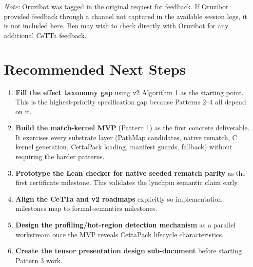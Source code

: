 \documentclass[11pt]{article}
\begin{document}
\vspace{1em}
\noindent\textit{Note:} Oruzibot was tagged in the original request for feedback. If Oruzibot provided feedback through a channel not captured in the available session logs, it is not included here. Ben may wish to check directly with Oruzibot for any additional CeTTa feedback.

\section{Recommended Next Steps}

\begin{enumerate}
    \item \textbf{Fill the effect taxonomy gap} using v2 Algorithm 1 as the starting point. This is the highest-priority specification gap because Patterns 2--4 all depend on it.

    \item \textbf{Build the match-kernel MVP} (Pattern 1) as the first concrete deliverable. It exercises every substrate layer (PathMap candidates, native rematch, C kernel generation, CettaPack loading, manifest guards, fallback) without requiring the harder patterns.

    \item \textbf{Prototype the Lean checker for native seeded rematch parity} as the first certificate milestone. This validates the lynchpin semantic claim early.

    \item \textbf{Align the CeTTa and v2 roadmaps} explicitly so implementation milestones map to formal-semantics milestones.

    \item \textbf{Design the profiling/hot-region detection mechanism} as a parallel workstream once the MVP reveals CettaPack lifecycle characteristics.

    \item \textbf{Create the tensor presentation design sub-document} before starting Pattern 3 work.
\end{enumerate}
\end{document}
